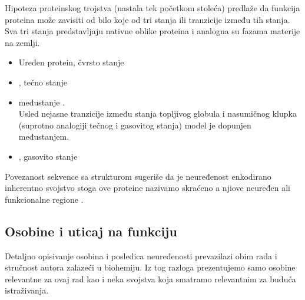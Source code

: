 Hipoteza proteinskog trojstva\parencite{dunker2001} (nastala tek početkom
stoleća) predlaže da funkcija proteina može zavisiti od bilo koje od tri
stanja ili tranzicije između tih stanja. Sva tri stanja predstavljaju
nativne oblike proteina i analogna su fazama materije na zemlji.
\begin{itemize}
  \item Uređen protein, čvrsto stanje
  \item {} , tečno stanje
  \item međustanje  . \\
        Usled nejasne tranzicije između stanja topljivog globula i nasumičnog klupka
        \parencite{2001} (suprotno analogiji tečnog i gasovitog stanja) model je
        dopunjen međustanjem.
  \item {} , gasovito stanje
\end{itemize}

Povezanost sekvence sa strukturom sugeriše da je
neuređenost enkodirano inherentno svojstvo \parencite{dunker2001} stoga ove
proteine nazivamo  skraćeno
 a njiove neuređen ali funkcionalne regione
.


\subsection {Osobine i uticaj na funkciju}
Detaljno opisivanje osobina i posledica neuređenosti prevazilazi obim rada i
stručnost autora zalazeći u biohemiju. Iz tog razloga prezentujemo samo osobine
relevantne za ovaj rad kao i neka svojstva koja smatramo relevantnim za buduća
istraživanja.


%
%
%
%




